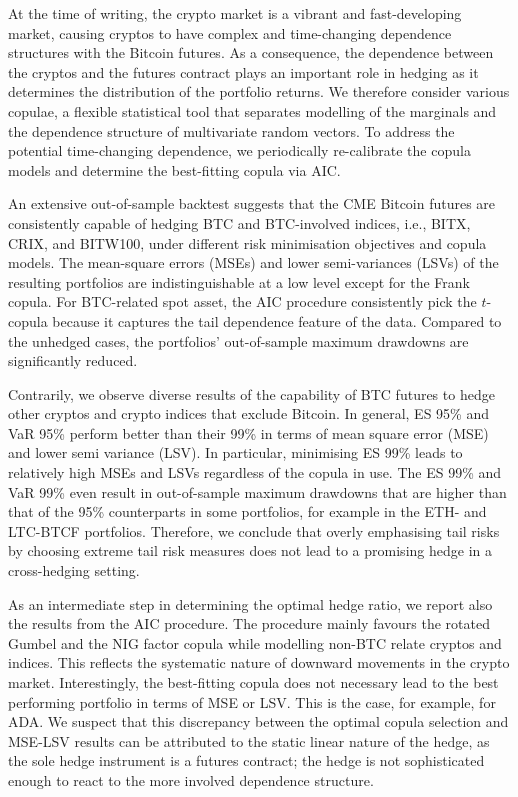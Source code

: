 \documentclass[11pt,a4paper,english]{article}
\begin{document}
At the time of writing, the crypto market is a vibrant and
fast-developing market, causing cryptos to have complex and
time-changing dependence structures with the Bitcoin futures.
As a consequence, the dependence between the cryptos and the futures
contract plays an important role in hedging as it determines the
distribution of the portfolio returns. We therefore consider various
copulae, a flexible statistical tool that separates modelling of the
marginals and the dependence structure of multivariate random
vectors. To address the potential time-changing dependence, we
periodically re-calibrate the copula models and determine the
best-fitting copula via AIC. 

An extensive out-of-sample backtest suggests that the CME Bitcoin futures
are consistently capable of hedging BTC and BTC-involved indices,
i.e., BITX, CRIX, and BITW100, under different risk minimisation
objectives 
and copula models. The mean-square errors (MSEs) and lower
semi-variances (LSVs) of the resulting portfolios are
indistinguishable at a low level except for the Frank copula. 
For BTC-related spot asset, the AIC procedure consistently
pick the $t$-copula because it  
captures the tail dependence feature of the data. 
Compared to the unhedged cases, the
portfolios' out-of-sample maximum drawdowns are significantly reduced. 

Contrarily, we observe diverse results of the capability of BTC
futures to hedge other cryptos and crypto indices that exclude Bitcoin. 
In general, ES 95\% and VaR 95\% perform better than their 99\%
in terms of mean square error (MSE) and lower semi variance (LSV).
In particular, minimising ES 99\% leads to relatively
high MSEs and LSVs regardless of the copula in use. The ES 99\% and
VaR 99\% even result in out-of-sample maximum drawdowns that are
higher than that of the 95\% counterparts in some portfolios, 
for example in the ETH- and LTC-BTCF portfolios.
Therefore, we conclude that overly emphasising tail risks by choosing
extreme tail risk measures does not lead to a promising hedge in a
cross-hedging setting. 

As an intermediate step in determining the optimal hedge ratio, we report also the results from the AIC procedure.
The procedure mainly favours the rotated Gumbel and the NIG
factor copula while modelling non-BTC relate cryptos and indices. This
reflects the systematic nature of 
downward movements in the crypto market. Interestingly, the best-fitting
copula does not necessary lead to the best performing portfolio in
terms of MSE or LSV. This is the case, for example, for ADA. 
We suspect that this discrepancy between the optimal copula selection and
MSE-LSV results can be attributed to the static linear nature of the
hedge, as the sole hedge instrument is a futures contract; the
hedge is not sophisticated enough to react to the more involved
dependence structure.
\end{document}
